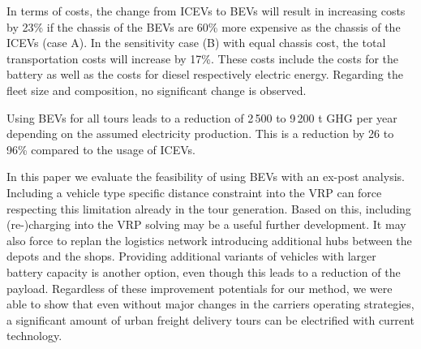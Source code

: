 In terms of costs, the change from ICEVs to BEVs will result in increasing costs by 23\% if the chassis of the BEVs are 60\% more expensive as the chassis of the ICEVs (case A). In the sensitivity case (B) with equal chassis cost, the total transportation costs will increase by 17\%. These costs include the costs for the battery as well as the costs for diesel respectively electric energy. 
Regarding the fleet size and composition, no significant change is observed. 

Using BEVs for all tours leads to a reduction of 2\,500 to 9\,200 t GHG per year depending on the assumed electricity production. This is a reduction by 26 to 96\% compared to the usage of ICEVs.

In this paper we evaluate the feasibility of using BEVs with an ex-post analysis. Including a vehicle type specific distance constraint into the VRP can force respecting this limitation already in the tour generation. 
Based on this, including (re-)charging into the VRP solving may be a useful further development. It may also force to replan the logistics network introducing additional hubs between the depots and the shops.
Providing additional variants of vehicles with larger battery capacity is another option, even though this leads to a reduction of the payload. 
Regardless of these improvement potentials for our method, we were able to show that even without major changes in the carriers operating strategies, a significant amount of urban freight delivery tours can be electrified with current technology.

